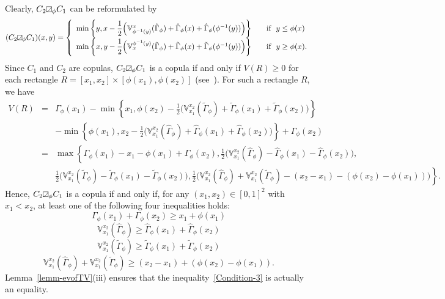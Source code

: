 \documentclass[12pt]{article}
\theoremstyle{plain}
\theoremstyle{definition}
\newcommand{\MySs}{
\begin{tikzpicture}[baseline]
\draw (0,0em) -- (0em,0.6em) -- (0.6em,0.6em) -- (0.6em,0em) -- (0,0em);
\draw (0,0em) parabola (0.6em, 0.6em);
\end{tikzpicture}}
\begin{document}
Clearly, $C_2\MySs_\phi C_1$ can be reformulated by
\[
(C_2\MySs_\phi C_1)(x, y)= \left \{
        \begin {array}{ll}
        \min\bigg\{y, x-\dfrac{1}{2}\Big(\mathbb{V}^{x}_{\phi^{-1}(y)}(\hat{\Gamma}_{\phi})+\hat{\Gamma}_{\phi}(x)+\hat{\Gamma}_{\phi}(\phi^{-1}(y)) \Big)\bigg\}
                  &\quad \text{if\ \ $y\leq\phi(x)$}  \\[2mm]
         \min\bigg\{x, y-\dfrac{1}{2}\Big(\mathbb{V}^{\phi^{-1}(y)}_{x}(\tilde{\Gamma}_{\phi})+\tilde{\Gamma}_{\phi}(x)+ \tilde{\Gamma}_{\phi}(\phi^{-1}(y))\Big)\bigg\}
                  &\quad \text{if\ \ $y\geq\phi(x)$.}
        \end {array}
       \right.
\]
Since $C_1$ and $C_2$ are copulas, $C_2\MySs_\phi C_1$ is a copula if and only if $V(R)\geq 0$ for each rectangle $R=[x_1, x_2]\times [\phi(x_1), \phi(x_2)]$ (see~\cite{JDHD21}). For such a rectangle $R$, we have
\begin{eqnarray*}
V(R)&=& \Gamma_\phi(x_1)-\min\left\{x_1, \phi(x_2)-\frac{1}{2}\Big(\mathbb{V}_{x_1}^{x_2}(\tilde{\Gamma}_\phi)+\tilde{\Gamma}_\phi(x_1)+\tilde{\Gamma}_\phi(x_2)\Big)\right\}\\
&&-\min\left\{\phi(x_1), x_2-\frac{1}{2}\Big(\mathbb{V}_{x_1}^{x_2}(\hat{\Gamma}_\phi)+\hat{\Gamma}_\phi(x_1)+\hat{\Gamma}_\phi(x_2)\Big)\right\}+\Gamma_\phi(x_2)\\
&=& \max\left\{\Gamma_\phi(x_1)-x_1-\phi(x_1)+\Gamma_\phi(x_2), \frac{1}{2}\Big(\mathbb{V}_{x_1}^{x_2}(\hat{\Gamma}_\phi)-\hat{\Gamma}_\phi(x_1)-\hat{\Gamma}_\phi(x_2)\Big),\right.\\
&& \frac{1}{2}\Big(\mathbb{V}_{x_1}^{x_2}(\tilde{\Gamma}_\phi)-\tilde{\Gamma}_\phi(x_1)-\tilde{\Gamma}_\phi(x_2)\Big), \left.\frac{1}{2}\Big(\mathbb{V}_{x_1}^{x_2}(\hat{\Gamma}_\phi)+\mathbb{V}_{x_1}^{x_2}(\tilde{\Gamma}_\phi)-(x_2-x_1)-(\phi(x_2)-\phi(x_1))\Big)\right\}.
\end{eqnarray*}
Hence, $C_2\MySs_\phi C_1$ is a copula if and only if, for any
$(x_1, x_2)\in[0, 1]^2$ with $x_1<x_2$, at least one of the following four inequalities holds:
\begin{equation}\label{Condition-4}
\Gamma_\phi(x_1)+\Gamma_\phi(x_2)\geq x_1+\phi(x_1)
\end{equation}
\begin{equation}\label{Condition-1}
\mathbb{V}_{x_1}^{x_2}(\hat{\Gamma}_\phi)\geq\hat{\Gamma}_\phi(x_1)+\hat{\Gamma}_\phi(x_2)
\end{equation}
\begin{equation}\label{Condition-2}
\mathbb{V}_{x_1}^{x_2}(\tilde{\Gamma}_\phi)\geq\tilde{\Gamma}_\phi(x_1)+\tilde{\Gamma}_\phi(x_2)
\end{equation}
\begin{equation}\label{Condition-3}
\mathbb{V}_{x_1}^{x_2}(\hat{\Gamma}_\phi)+\mathbb{V}_{x_1}^{x_2}(\tilde{\Gamma}_\phi)\geq(x_2-x_1)+(\phi(x_2)-\phi(x_1)).
\end{equation}
Lemma~\ref{lemm-evofTV}(iii) ensures that the inequality~\eqref{Condition-3} is actually an equality.
\end{document}
